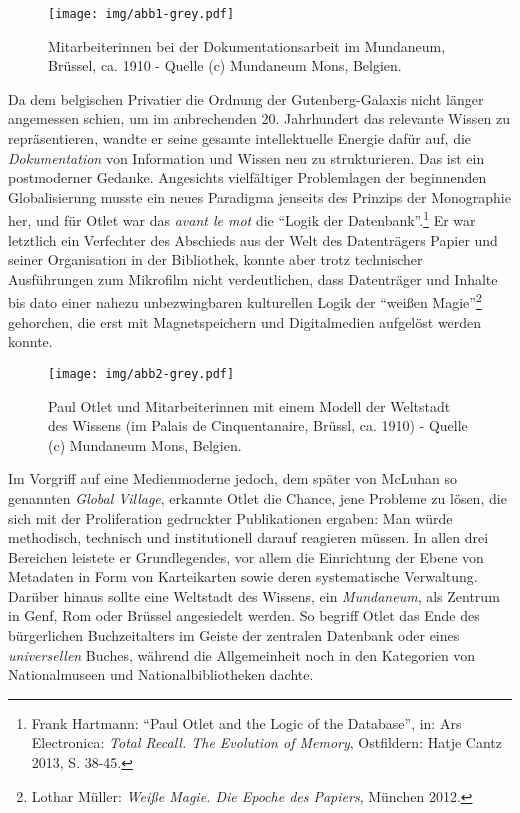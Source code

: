 \begin{figure}[htbp]
\centering
\texttt{[image: img/abb1-grey.pdf]}
\caption*{Mitarbeiterinnen bei der Dokumentationsarbeit im Mundaneum,
Brüssel, ca. 1910 - Quelle (c) Mundaneum Mons, Belgien.}
\end{figure}

Da dem belgischen Privatier die Ordnung der Gutenberg-Galaxis nicht
länger angemessen schien, um im anbrechenden 20. Jahrhundert das
relevante Wissen zu repräsentieren, wandte er seine gesamte
intellektuelle Energie dafür auf, die \emph{Dokumentation} von
Information und Wissen neu zu strukturieren. Das ist ein postmoderner
Gedanke. Angesichts vielfältiger Problemlagen der beginnenden
Globalisierung musste ein neues Paradigma jenseits des Prinzips der
Monographie her, und für Otlet war das \emph{avant le mot} die
\enquote{Logik der Datenbank}.\footnote{Frank Hartmann: \enquote{Paul
  Otlet and the Logic of the Database}, in: Ars Electronica: \emph{Total
  Recall. The Evolution of Memory}, Ostfildern: Hatje Cantz 2013, S.
  38-45.} Er war letztlich ein Verfechter des Abschieds aus der Welt des
Datenträgers Papier und seiner Organisation in der Bibliothek, konnte
aber trotz technischer Ausführungen zum Mikrofilm nicht verdeutlichen,
dass Datenträger und Inhalte bis dato einer nahezu unbezwingbaren
kulturellen Logik der \enquote{weißen Magie}\footnote{Lothar Müller:
  \emph{Weiße Magie. Die Epoche des Papiers}, München 2012.} gehorchen,
die erst mit Magnetspeichern und Digitalmedien aufgelöst werden konnte.

\begin{figure}[htbp]
\centering
\texttt{[image: img/abb2-grey.pdf]}
\caption*{Paul Otlet und Mitarbeiterinnen mit einem Modell der Weltstadt
des Wissens (im Palais de Cinquentanaire, Brüssl, ca. 1910) - Quelle (c)
Mundaneum Mons, Belgien.}
\end{figure}

Im Vorgriff auf eine Medienmoderne jedoch, dem später von McLuhan so
genannten \emph{Global Village}, erkannte Otlet die Chance, jene
Probleme zu lösen, die sich mit der Proliferation gedruckter
Publikationen ergaben: Man würde methodisch, technisch und
institutionell darauf reagieren müssen. In allen drei Bereichen leistete
er Grundlegendes, vor allem die Einrichtung der Ebene von Metadaten in
Form von Karteikarten sowie deren systematische Verwaltung. Darüber
hinaus sollte eine Weltstadt des Wissens, ein \emph{Mundaneum}, als
Zentrum in Genf, Rom oder Brüssel angesiedelt werden. So begriff Otlet
das Ende des bürgerlichen Buchzeitalters im Geiste der zentralen
Datenbank oder eines \emph{universellen} Buches, während die
Allgemeinheit noch in den Kategorien von Nationalmuseen und
Nationalbibliotheken dachte.

